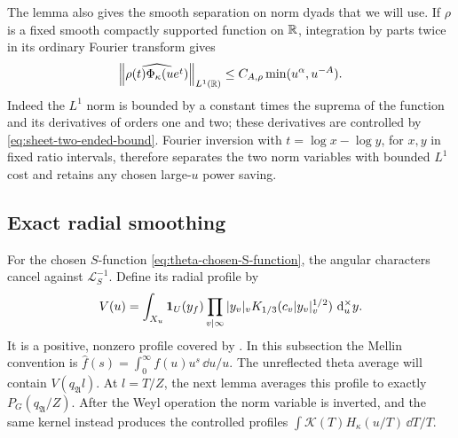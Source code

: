 The lemma also gives the smooth separation on norm dyads that we
will use.  If \(\rho\) is a fixed smooth compactly supported
function on \(\mathbb{R}\), integration by parts twice in its ordinary
Fourier transform gives
\begin{equation}\label{eq:sheet-fourier-separation}
 \left\|\widehat{\rho(t)\Phi_\kappa(u e^t)}\right\|_{L^1(\mathbb{R})}
 \le C_{A,\rho}\min(u^\alpha,u^{-A}).
\end{equation}
Indeed the \(L^1\) norm is bounded by a constant times the suprema
of the function and its derivatives of orders one and two;
these derivatives are controlled by
\eqref{eq:sheet-two-ended-bound}.  Fourier inversion with
\(t=\log x-\log y\), for \(x,y\) in fixed ratio intervals, therefore
separates the two norm variables with bounded \(L^1\) cost and
retains any chosen large-\(u\) power saving.

\subsection{Exact radial smoothing}

For the chosen \(S\)-function \eqref{eq:theta-chosen-S-function},
the angular characters cancel against \(\mathcal L_S^{-1}\).  Define its
radial profile by
\begin{equation}\label{eq:theta-V-profile}
 V(u)=\int_{X_u}\mathbf{1}_U(y_f)
       \prod_{v\mid\infty}|y_v|_v
           K_{1/3}(c_v|y_v|_v^{1/2})\,\,\mathrm{d}^\times_u y.
\end{equation}
It is a positive, nonzero profile covered by
.  In this subsection the Mellin convention is
\(\widehat f(s)=\int_0^\infty f(u)u^s\,\dd u/u\).
The unreflected theta average will contain \(V(q_{\mathfrak A}l)\).
At \(l=T/Z\), the next lemma averages this profile to exactly
\(P_G(q_{\mathfrak A}/Z)\).  After the Weyl operation the norm variable
is inverted, and the same kernel instead produces the controlled profiles
\(\int\mathcal K(T)H_\kappa(u/T)\,\dd T/T\).

